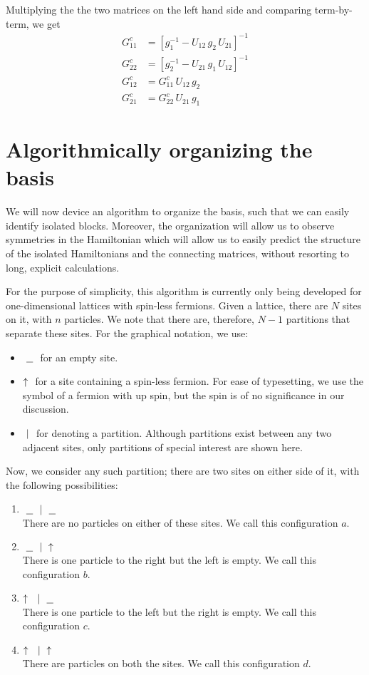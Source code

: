 	Multiplying the the two matrices on the left hand side and comparing term-by-term, we get
	\begin{align}
		G^{c}_{11} &= \left[ g^{-1}_{1} - U_{12}\,g_2\,U_{21}  \right]^{-1}\\
		G^{c}_{22} &= \left[ g^{-1}_{2} - U_{21}\,g_1\,U_{12}  \right]^{-1}\\
		G^{c}_{12} &= G^{c}_{11}\,U_{12}\,g_2\\
		G^{c}_{21} &= G^{c}_{22}\,U_{21}\,g_1
	\end{align}

\section{Algorithmically organizing the basis}
	We will now device an algorithm to organize the basis, such that we can easily identify isolated blocks. Moreover, the organization will allow us to observe symmetries in the Hamiltonian which will allow us to easily predict the structure of the isolated Hamiltonians and the connecting matrices, without resorting to long, explicit calculations.
	
	For the purpose of simplicity, this algorithm is currently only being developed for one-dimensional lattices with spin-less fermions. Given a lattice, there are $ N $ sites on it, with $ n $ particles. We note that there are, therefore, $ N-1 $ partitions that separate these sites. For the graphical notation, we use:
	\begin{itemize}
		\item $ \ \underline{\ \ }\  $ for an empty site.
		\item $ \uparrow\  $ for a site containing a spin-less fermion. For ease of typesetting, we use the symbol of a fermion with up spin, but the spin is of no significance in our discussion.
		\item $ \ |\  $ for denoting a partition. Although partitions exist between any two adjacent sites, only partitions of special interest are shown here.
 	\end{itemize}
	
	Now, we consider any such partition; there are two sites on either side of it, with the following possibilities:
	\begin{enumerate}
		\item $ \ \underline{\ \ }\  \ |\  \ \underline{\ \ }\  $\\ 
		There are no particles on either of these sites. We call this configuration $ a $.
		\item  $ \ \underline{\ \ }\  \ |\  \uparrow\  $\\
		There is one particle to the right but the left is empty. We call this configuration $ b $.
		\item $ \uparrow\  \ |\  \ \underline{\ \ }\  $\\
		There is one particle to the left but the right is empty. We call this configuration $ c $.
		\item $ \uparrow\  \ |\  \uparrow\  $\\
		There are particles on both the sites. We call this configuration $ d $.
	\end{enumerate}
	
